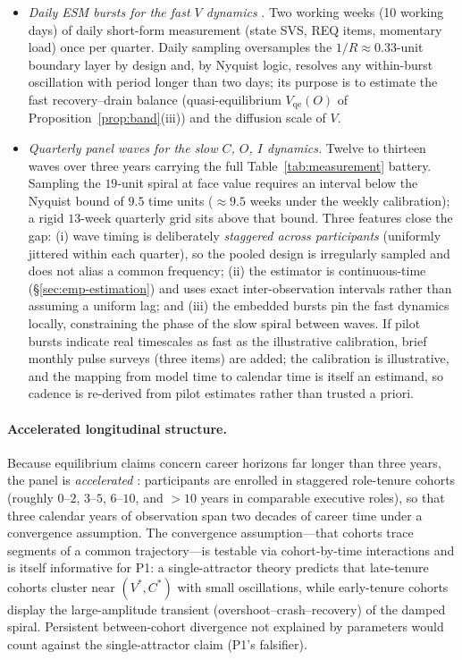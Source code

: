 \begin{itemize}
\item \emph{Daily ESM bursts for the fast $V$ dynamics}
\citep{beal2015esm,sliwinski2008burst}. Two working weeks
(10 working days) of daily short-form measurement (state SVS, REQ items,
momentary load) once per quarter. Daily sampling oversamples the
$1/R\approx0.33$-unit boundary layer by design and, by Nyquist logic,
resolves any within-burst oscillation with period longer than two days;
its purpose is to estimate the fast recovery--drain balance
(quasi-equilibrium $V_{\mathrm{qe}}(O)$ of Proposition~\ref{prop:band}(iii))
and the diffusion scale of $V$.
\item \emph{Quarterly panel waves for the slow $C$, $O$, $I$ dynamics.}
Twelve to thirteen waves over three years carrying the full
Table~\ref{tab:measurement} battery. Sampling the $19$-unit spiral at
face value requires an interval below the Nyquist bound of $9.5$ time
units ($\approx9.5$ weeks under the weekly calibration); a rigid
$13$-week quarterly grid sits above that bound. Three features close the
gap: (i) wave timing is deliberately \emph{staggered across participants}
(uniformly jittered within each quarter), so the pooled design is
irregularly sampled and does not alias a common frequency; (ii) the
estimator is continuous-time (\S\ref{sec:emp-estimation}) and uses exact
inter-observation intervals rather than assuming a uniform lag; and
(iii) the embedded bursts pin the fast dynamics locally, constraining the
phase of the slow spiral between waves. If pilot bursts indicate real
timescales as fast as the illustrative calibration, brief monthly pulse
surveys (three items) are added; the calibration is illustrative, and the
mapping from model time to calendar time is itself an estimand, so cadence
is re-derived from pilot estimates rather than trusted a priori.
\end{itemize}

\paragraph{Accelerated longitudinal structure.}
Because equilibrium claims concern career horizons far longer than three
years, the panel is \emph{accelerated} \citep{bell1953convergence}:
participants are enrolled in staggered role-tenure cohorts (roughly $0$--$2$, $3$--$5$, $6$--$10$, and
$>\!10$ years in comparable executive roles), so that three calendar years
of observation span two decades of career time under a convergence
assumption. The convergence assumption---that cohorts trace segments of a
common trajectory---is testable via cohort-by-time interactions and is
itself informative for P1: a single-attractor theory predicts that
late-tenure cohorts cluster near $(V^{*},C^{*})$ with small oscillations,
while early-tenure cohorts display the large-amplitude transient
(overshoot--crash--recovery) of the damped spiral. Persistent
between-cohort divergence not explained by parameters would count against
the single-attractor claim (P1's falsifier).

